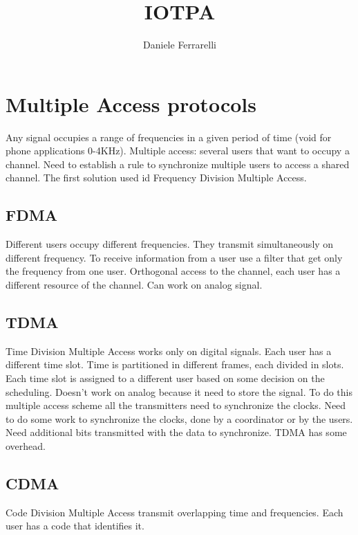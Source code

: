 \documentclass[]{article}
\title{IOTPA}
\author{Daniele Ferrarelli}
\date{}
\begin{document}
\maketitle
\section{Multiple Access protocols}
Any signal occupies a range of frequencies in a given period of time (void for phone applications 0-4KHz). Multiple access: several users that want to occupy a channel. Need to establish a rule to synchronize multiple users to access a shared channel. The first solution used id Frequency Division Multiple Access.

\subsection{FDMA}
Different users occupy different frequencies. They transmit simultaneously on different frequency. To receive information from a user use a filter that get only the frequency from one user. Orthogonal access to the channel, each user has a different resource of the channel. Can work on analog signal. 

\subsection{TDMA}
Time Division Multiple Access works only on digital signals. Each user has a different time slot. Time is partitioned in different frames, each divided in slots. Each time slot is assigned to a different user based on some decision on the scheduling. Doesn't work on analog because it need to store the signal. To do this multiple access scheme all the transmitters need to synchronize the clocks. Need to do some work to synchronize the clocks, done by a coordinator or by the users. Need additional bits transmitted with the data to synchronize. TDMA has some overhead. 

\subsection{CDMA}
Code Division Multiple Access transmit overlapping time and frequencies. Each user has a code that identifies it. 
\end{document}
